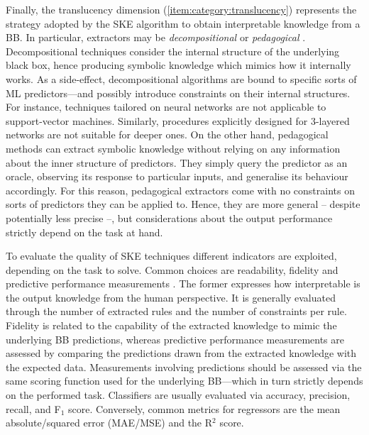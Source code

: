 \documentclass[
]{ceurart}
\begin{document}
Finally, the translucency dimension (\cref{item:category:translucency}) represents the strategy adopted by the SKE algorithm to obtain interpretable knowledge from a BB.
%
In particular, extractors may be \emph{decompositional} or \emph{pedagogical} \cite{andrews1995survey,xaisurvey-ia14}. %
%
Decompositional techniques consider the internal structure of the underlying black box, hence producing symbolic knowledge which mimics how it internally works.
%
As a side-effect, decompositional algorithms are bound to specific sorts of ML predictors---and possibly introduce constraints on their internal structures.
%
For instance, techniques tailored on neural networks are not applicable to support-vector machines.
%
Similarly, procedures explicitly designed for 3-layered networks are not suitable for deeper ones.
%
On the other hand, pedagogical methods can extract symbolic knowledge without relying on any information about the inner structure of predictors. 
%
They simply query the predictor as an oracle, observing its response to particular inputs, and generalise its behaviour accordingly.
%
For this reason, pedagogical extractors come with no constraints on sorts of predictors they can be applied to.
%
Hence, they are more general -- despite potentially less precise --, but considerations about the output performance strictly depend on the task at hand.
%

To evaluate the quality of SKE techniques different indicators are exploited, depending on the task to solve.
%
Common choices are readability, fidelity and predictive performance measurements \cite{towell1993extracting}.
%
The former expresses how interpretable is the output knowledge from the human perspective.
%
It is generally evaluated through the number of extracted rules and the number of constraints per rule.
%
Fidelity is related to the capability of the extracted knowledge to mimic the underlying BB predictions, whereas predictive performance measurements are assessed by comparing the predictions drawn from the extracted knowledge with the expected data.
%
Measurements involving predictions should be assessed via the same scoring function used for the underlying BB---which in turn strictly depends on the performed task.
%
Classifiers are usually evaluated via accuracy, precision, recall, and F$_1$ score.
%
Conversely, common metrics for regressors are the mean absolute/squared error (MAE/MSE) and the R${^2}$ score.
\end{document}
